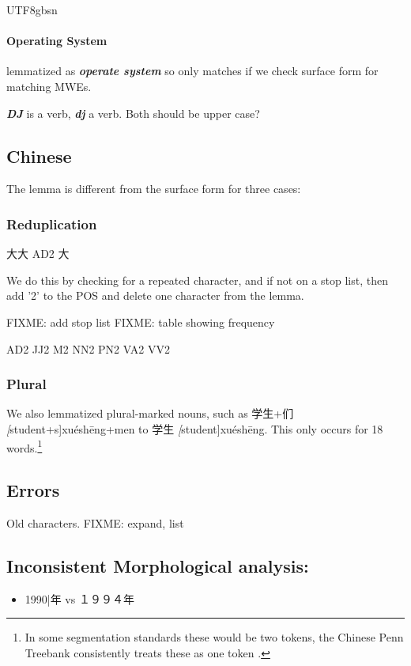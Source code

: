 \documentclass[12pt]{book} %
\newcommand{\cmn}[1]{\textit{#1}}
\newcommand{\lex}[1]{\textbf{\textit{#1}}}
\begin{document}
\begin{CJK}{UTF8}{gbsn}
\paragraph{Operating System} lemmatized as \lex{operate system} so only
matches if we check surface form for matching MWEs.


\lex{DJ} is a verb, \lex{dj} a verb.  Both should be upper case?

\subsection{Chinese}

The lemma is different from the surface form for three
cases:

\subsubsection{Reduplication}
大大 AD2  大

We do this by checking for a repeated character, and if not on a stop
list, then add '2' to the POS and delete one character from the lemma.

FIXME: add stop list
FIXME: table showing frequency

AD2
JJ2        
M2        
NN2        
PN2        
VA2        
VV2       
\subsubsection{Plural}

 We also lemmatized plural-marked nouns, such
as 学生+们 \cmn[student+s]{xuéshēng+men}
to 学生 \cmn[student]{xuéshēng}.  This only occurs for 18
words.\footnote{In some segmentation standards these would be two
  tokens, the Chinese Penn Treebank consistently treats these as one
  token \citep{Xia:2000}.} 

\subsection{Errors}

Old characters.
FIXME: expand, list

\subsection{Inconsistent Morphological analysis:}
\begin{itemize}
\item 1990|年 vs １９９４年
\end{itemize}



\end{CJK}
\end{document}
